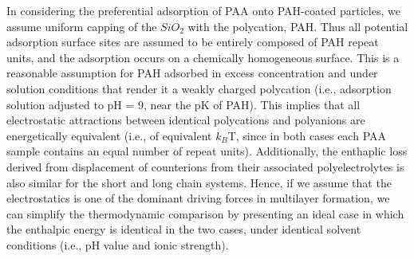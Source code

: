 \documentclass[journal=mamobx,manuscript=article]{achemso}
\begin{document}
In considering the preferential adsorption of PAA onto PAH-coated particles, we assume uniform capping of the $SiO_2$ with the polycation, PAH.  Thus all potential adsorption surface sites are assumed to be entirely composed of PAH repeat units, and the adsorption occurs on a chemically homogeneous surface.  This is a reasonable assumption for PAH adsorbed in excess concentration and under solution conditions that render it a weakly charged polycation (i.e., adsorption solution adjusted to pH = 9, near the pK of PAH).\cite{Burke2003,Smith2003}  This implies that all electrostatic attractions between identical polycations and polyanions are energetically equivalent (i.e., of equivalent $k_B$T, since in both cases each PAA sample contains an equal number of repeat units).\cite{Dubas1999}  Additionally, the enthaplic loss derived from displacement of counterions from their associated polyelectrolytes is also similar for the short and long chain systems.  Hence, if we assume that the electrostatics is one of the dominant driving forces in multilayer formation, we can simplify the thermodynamic comparison by presenting an ideal case in which the enthalpic energy is identical in the two cases, under identical solvent conditions (i.e., pH value and ionic strength). 
\end{document}
